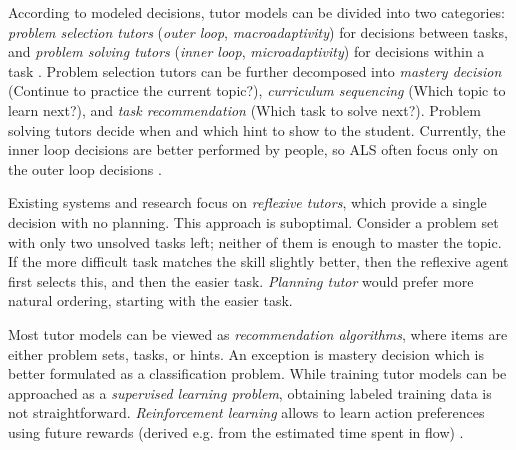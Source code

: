 According to modeled decisions, tutor models can be divided into two categories:
\emph{problem selection tutors} (\emph{outer loop}, \emph{macroadaptivity})
for decisions between tasks, %
and \emph{problem solving tutors} (\emph{inner loop}, \emph{microadaptivity})
for decisions within a task \cite{its-learner-models}. %
Problem selection tutors can be further decomposed %
into
\emph{mastery decision} (Continue to practice the current topic?),
\emph{curriculum sequencing} (Which topic to learn next?),
and \emph{task recommendation} (Which task to solve next?).
Problem solving tutors decide when and which hint to show to the
student. %
Currently, the inner loop decisions are better performed by people,
so ALS often focus only on the outer loop decisions \cite{als-future}.

Existing systems and research focus on \emph{reflexive tutors}, which
provide a single decision with no planning. %
This approach is suboptimal. Consider a problem set with only two
unsolved tasks left; neither of them is enough to master the topic.
If the more difficult task matches the skill slightly better, then
the reflexive agent first selects this, and then the easier task.
\emph{Planning tutor} would prefer more natural ordering,
starting with the easier task.

Most tutor models can be viewed as \emph{recommendation algorithms}, %
where items are either problem sets, tasks, or hints.
An exception is mastery decision which is better formulated as a
classification problem.
While training tutor models can be approached as a \emph{supervised learning problem}, %
obtaining labeled training data is not straightforward.
\emph{Reinforcement learning}  \cite{rl}
allows to learn action preferences using future rewards
(derived e.g. from the estimated time spent in flow)
\cite{rl-for-tutors-evaluation}.

